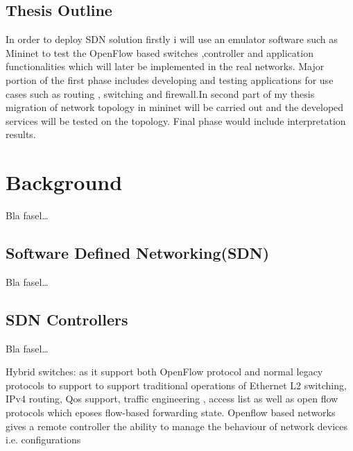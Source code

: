 \section{Thesis Outline}
\label{ch:Einleitung:sec:Gliederung}
In order to deploy SDN solution firstly i will use an emulator software such as Mininet to test the OpenFlow based switches ,controller and application functionalities which will later be implemented in the real networks. Major portion of the first  phase includes developing and testing applications for  use cases such as routing , switching and firewall.In second part of my thesis migration of network topology in mininet will be carried out and the developed services will be tested on the topology. Final phase would include interpretation results.  



\chapter{Background}
\label{ch:Analyse}
Bla fasel\ldots

\section{Software Defined Networking(SDN)}
\label{ch:Analyse:sec:Abschnitt1}

Bla fasel\ldots

\section{SDN  Controllers}
\label{ch:Analyse:sec:Abschnitt2}

Bla fasel\ldots

 
Hybrid switches: as it support both OpenFlow protocol and normal legacy protocols to support to support traditional operations of Ethernet L2 switching, IPv4 routing, Qos support, traffic engineering , access list as well as open flow protocols which eposes flow-based forwarding state.     
Openflow based networks gives a remote controller the ability to manage the behaviour of network devices i.e. configurations
